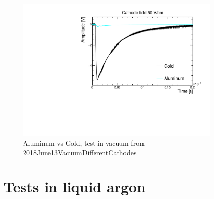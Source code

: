 \documentclass[a4paper,11pt]{article}
\begin{document}
\begin{figure}[tb]
	\begin{center}
	\includegraphics[width=0.9\textwidth]{figures/AluminumVSGold_50Vcm.pdf}	
	\caption{Aluminum vs Gold, test in vacuum from 2018June13VacuumDifferentCathodes
	}
	\label{fig:AluminumVSgold}
	\end{center}
\end{figure}




\section{Tests in liquid argon}
\end{document}
